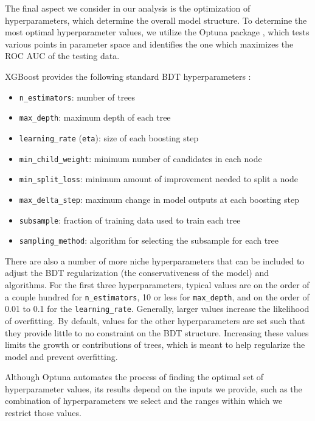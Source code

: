The final aspect we consider in our analysis is the optimization of hyperparameters, which determine the overall model structure. To determine the most optimal hyperparameter values, we utilize the Optuna package \cite{Optuna}, which tests various points in parameter space and identifies the one which maximizes the ROC AUC of the testing data.

XGBoost provides the following standard BDT hyperparameters \cite{XGBoost_docs}:
\begin{itemize}
    \item \texttt{n\_estimators}: number of trees
    \item \texttt{max\_depth}: maximum depth of each tree
    \item \texttt{learning\_rate} (\texttt{eta}): size of each boosting step
    \item \texttt{min\_child\_weight}: minimum number of candidates in each node
    \item \texttt{min\_split\_loss}: minimum amount of improvement needed to split a node
    \item \texttt{max\_delta\_step}: maximum change in model outputs at each boosting step
    \item \texttt{subsample}: fraction of training data used to train each tree
    \item \texttt{sampling\_method}: algorithm for selecting the subsample for each tree
\end{itemize}
There are also a number of more niche hyperparameters that can be included to adjust the BDT regularization (the conservativeness of the model) and algorithms. For the first three hyperparameters, typical values are on the order of a couple hundred for \texttt{n\_estimators}, 10 or less for \texttt{max\_depth}, and on the order of 0.01 to 0.1 for the \texttt{learning\_rate}. Generally, larger values increase the likelihood of overfitting. By default, values for the other hyperparameters are set such that they provide little to no constraint on the BDT structure. Increasing these values limits the growth or contributions of trees, which is meant to help regularize the model and prevent overfitting.

Although Optuna automates the process of finding the optimal set of hyperparameter values, its results depend on the inputs we provide, such as the combination of hyperparameters we select and the ranges within which we restrict those values.